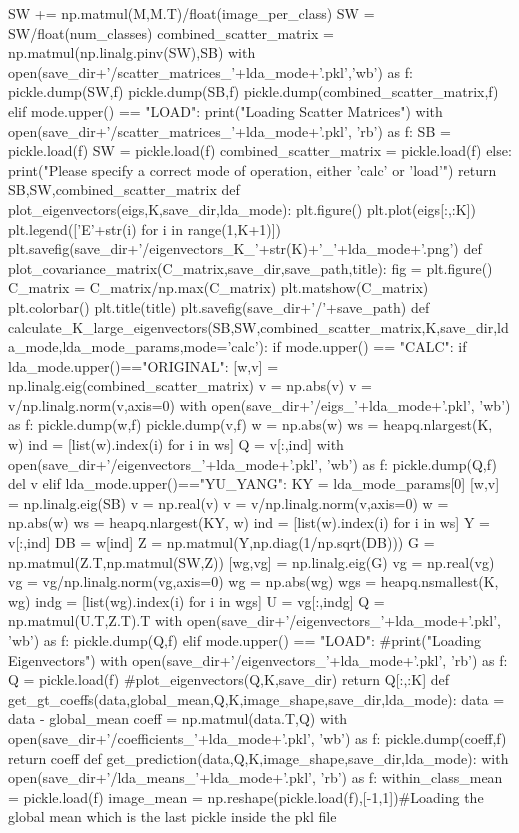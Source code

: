 \documentclass{article}
\begin{document}
\begin{python}
			SW += np.matmul(M,M.T)/float(image_per_class)
		SW = SW/float(num_classes)
		combined_scatter_matrix = np.matmul(np.linalg.pinv(SW),SB)
		with open(save_dir+'/scatter_matrices_'+lda_mode+'.pkl','wb') as f:
			pickle.dump(SW,f)
			pickle.dump(SB,f)
			pickle.dump(combined_scatter_matrix,f)
	elif mode.upper() == "LOAD":
		print("Loading Scatter Matrices")
		with open(save_dir+'/scatter_matrices_'+lda_mode+'.pkl', 'rb') as f:
			SB = pickle.load(f)
			SW = pickle.load(f)
			combined_scatter_matrix = pickle.load(f)
	else:
		print("Please specify a correct mode of operation, either 'calc' or 'load'")
	return SB,SW,combined_scatter_matrix
def plot_eigenvectors(eigs,K,save_dir,lda_mode):
	plt.figure()
	plt.plot(eigs[:,:K])
	plt.legend(['E'+str(i) for i in range(1,K+1)])
	plt.savefig(save_dir+'/eigenvectors_K_'+str(K)+'_'+lda_mode+'.png')
def plot_covariance_matrix(C_matrix,save_dir,save_path,title):
	fig = plt.figure()
	C_matrix = C_matrix/np.max(C_matrix)
	plt.matshow(C_matrix)
	plt.colorbar()
	plt.title(title)
	plt.savefig(save_dir+'/'+save_path)
def calculate_K_large_eigenvectors(SB,SW,combined_scatter_matrix,K,save_dir,lda_mode,lda_mode_params,mode='calc'):
	if mode.upper() == "CALC":
		if lda_mode.upper()=="ORIGINAL":
			[w,v] = np.linalg.eig(combined_scatter_matrix)
			v = np.abs(v)
			v = v/np.linalg.norm(v,axis=0)
			with open(save_dir+'/eigs_'+lda_mode+'.pkl', 'wb') as f:
				pickle.dump(w,f)
				pickle.dump(v,f)
			w = np.abs(w)
			ws = heapq.nlargest(K, w)
			ind = [list(w).index(i) for i in ws]
			Q = v[:,ind]
			with open(save_dir+'/eigenvectors_'+lda_mode+'.pkl', 'wb') as f:
				pickle.dump(Q,f)
			del v
		elif lda_mode.upper()=="YU_YANG":
			KY = lda_mode_params[0]
			[w,v] = np.linalg.eig(SB)
			v = np.real(v)
			v = v/np.linalg.norm(v,axis=0)
			w = np.abs(w)
			ws = heapq.nlargest(KY, w)
			ind = [list(w).index(i) for i in ws]
			Y = v[:,ind]
			DB = w[ind]
			Z = np.matmul(Y,np.diag(1/np.sqrt(DB)))
			G = np.matmul(Z.T,np.matmul(SW,Z))
			[wg,vg] = np.linalg.eig(G)
			vg = np.real(vg)
			vg = vg/np.linalg.norm(vg,axis=0)
			wg = np.abs(wg)
			wgs = heapq.nsmallest(K, wg)
			indg = [list(wg).index(i) for i in wgs]
			U = vg[:,indg]
			Q = np.matmul(U.T,Z.T).T
			with open(save_dir+'/eigenvectors_'+lda_mode+'.pkl', 'wb') as f:
				pickle.dump(Q,f)
	elif mode.upper() == "LOAD":
		#print("Loading Eigenvectors")
		with open(save_dir+'/eigenvectors_'+lda_mode+'.pkl', 'rb') as f:
			Q = pickle.load(f)
	#plot_eigenvectors(Q,K,save_dir)
	return Q[:,:K]
def get_gt_coeffs(data,global_mean,Q,K,image_shape,save_dir,lda_mode):
	data = data - global_mean
	coeff = np.matmul(data.T,Q)
	with open(save_dir+'/coefficients_'+lda_mode+'.pkl', 'wb') as f:
		pickle.dump(coeff,f)
	return coeff
def get_prediction(data,Q,K,image_shape,save_dir,lda_mode):
	with open(save_dir+'/lda_means_'+lda_mode+'.pkl', 'rb') as f:
		within_class_mean = pickle.load(f)
		image_mean = np.reshape(pickle.load(f),[-1,1])#Loading the global mean which is the last pickle inside the pkl file


\end{python}
\end{document}
